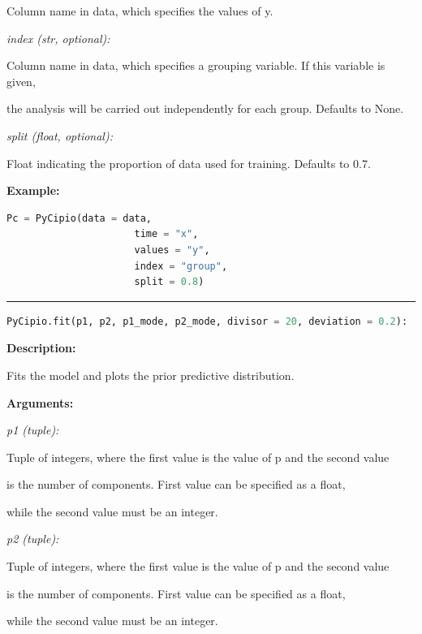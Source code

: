 \documentclass{article}
\begin{document}
\indent \indent \indent Column name in data, which specifies the values of y.
            
\indent \indent \textit{index (str, optional):} 

\indent \indent \indent Column name in data, which specifies a grouping variable. If this variable is given, 

\indent \indent \indent the analysis will be carried out independently for each group. Defaults to None.

\indent \indent \textit{split (float, optional):} 

\indent \indent \indent Float indicating the proportion of data used for training. Defaults to 0.7.


\indent \textbf{Example:}
\begin{lstlisting}[language=Python]
		 Pc = PyCipio(data = data, 
                      time = "x", 
                      values = "y", 
                      index = "group", 
                      split = 0.8)

\end{lstlisting}

\hrule

\begin{lstlisting}[language=Python]
    PyCipio.fit(p1, p2, p1_mode, p2_mode, divisor = 20, deviation = 0.2):
\end{lstlisting}

\indent \textbf{Description:} 

\indent \indent Fits the model and plots the prior predictive distribution.

\indent \textbf{Arguments:}

\indent \indent \textit{p1 (tuple):} 

\indent \indent \indent Tuple of integers, where the first value is the value of p and the second value

\indent \indent \indent is the number of components. First value can be specified as a float, 

\indent \indent \indent while the second value must be an integer.

\indent \indent \textit{p2 (tuple):} 

\indent \indent \indent Tuple of integers, where the first value is the value of p and the second value

\indent \indent \indent is the number of components. First value can be specified as a float, 

\indent \indent \indent while the second value must be an integer.
\end{document}
